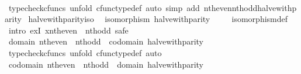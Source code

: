\begin{isabellebody}
\ \ \ \ \isamarkupfalse%
\ {\isacharparenleft}{\kern0pt}typecheck{\isacharunderscore}{\kern0pt}cfuncs{\isacharcomma}{\kern0pt}\ unfold\ cfunc{\isacharunderscore}{\kern0pt}type{\isacharunderscore}{\kern0pt}def{\isacharcomma}{\kern0pt}\ auto\ simp\ add{\isacharcolon}{\kern0pt}\ nth{\isacharunderscore}{\kern0pt}even{\isacharunderscore}{\kern0pt}nth{\isacharunderscore}{\kern0pt}odd{\isacharunderscore}{\kern0pt}halve{\isacharunderscore}{\kern0pt}with{\isacharunderscore}{\kern0pt}parity{\isacharparenright}{\kern0pt}\isanewline
{}\isamarkupfalse%
%
\endisatagproof
{\isafoldproof}%
%
\isadelimproof
\isanewline
%
\endisadelimproof
\isanewline
{}\isamarkupfalse%
\ halve{\isacharunderscore}{\kern0pt}with{\isacharunderscore}{\kern0pt}parity{\isacharunderscore}{\kern0pt}iso{\isacharcolon}{\kern0pt}\isanewline
\ \ {\isachardoublequoteopen}isomorphism\ halve{\isacharunderscore}{\kern0pt}with{\isacharunderscore}{\kern0pt}parity{\isachardoublequoteclose}\isanewline
%
\isadelimproof
\ \ \ %
\endisadelimproof
%
\isatagproof
{}\isamarkupfalse%
\ isomorphism{\isacharunderscore}{\kern0pt}def\isanewline
{}\isamarkupfalse%
\ {\isacharparenleft}{\kern0pt}intro\ exI{\isacharbrackleft}{\kern0pt}\ x{\isacharequal}{\kern0pt}{\isachardoublequoteopen}nth{\isacharunderscore}{\kern0pt}even\ {\isasymamalg}\ nth{\isacharunderscore}{\kern0pt}odd{\isachardoublequoteclose}{\isacharbrackright}{\kern0pt}{\isacharcomma}{\kern0pt}\ safe{\isacharparenright}{\kern0pt}\isanewline
\ \ \isamarkupfalse%
\ {\isachardoublequoteopen}domain\ {\isacharparenleft}{\kern0pt}nth{\isacharunderscore}{\kern0pt}even\ {\isasymamalg}\ nth{\isacharunderscore}{\kern0pt}odd{\isacharparenright}{\kern0pt}\ {\isacharequal}{\kern0pt}\ codomain\ halve{\isacharunderscore}{\kern0pt}with{\isacharunderscore}{\kern0pt}parity{\isachardoublequoteclose}\isanewline
\ \ \ \ \isamarkupfalse%
\ {\isacharparenleft}{\kern0pt}typecheck{\isacharunderscore}{\kern0pt}cfuncs{\isacharcomma}{\kern0pt}\ unfold\ cfunc{\isacharunderscore}{\kern0pt}type{\isacharunderscore}{\kern0pt}def{\isacharcomma}{\kern0pt}\ auto{\isacharparenright}{\kern0pt}\isanewline
\ \ \isamarkupfalse%
\ {\isachardoublequoteopen}codomain\ {\isacharparenleft}{\kern0pt}nth{\isacharunderscore}{\kern0pt}even\ {\isasymamalg}\ nth{\isacharunderscore}{\kern0pt}odd{\isacharparenright}{\kern0pt}\ {\isacharequal}{\kern0pt}\ domain\ halve{\isacharunderscore}{\kern0pt}with{\isacharunderscore}{\kern0pt}parity{\isachardoublequoteclose}\isanewline

\end{isabellebody}
